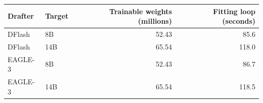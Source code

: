 \begin{tabular}{llrr}
\toprule
Drafter & Target & Trainable weights (millions) & Fitting loop (seconds) \\
\midrule
DFlash & 8B & 52.43 & 85.6 \\
DFlash & 14B & 65.54 & 118.0 \\
EAGLE-3 & 8B & 52.43 & 86.7 \\
EAGLE-3 & 14B & 65.54 & 118.5 \\
\bottomrule
\end{tabular}

